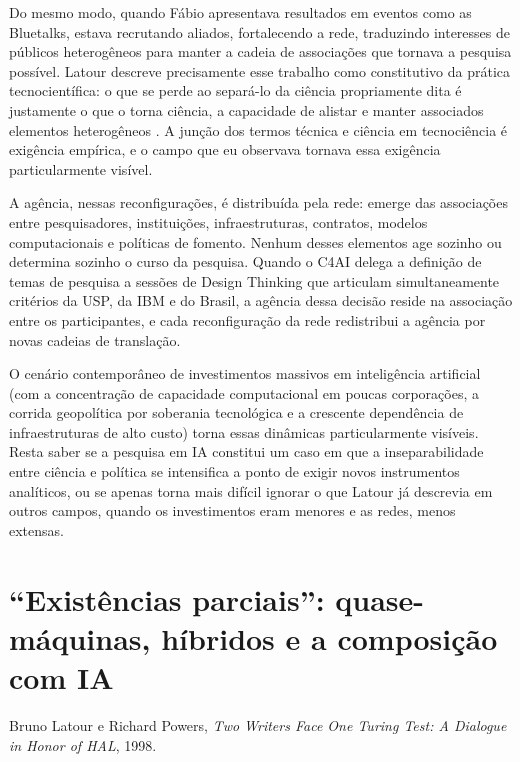 Do mesmo modo, quando Fábio apresentava resultados em eventos como as Bluetalks, estava recrutando aliados, fortalecendo a rede, traduzindo interesses de públicos heterogêneos para manter a cadeia de associações que tornava a pesquisa possível. Latour descreve precisamente esse trabalho como constitutivo da prática tecnocientífica: o que se perde ao separá-lo da ciência propriamente dita é justamente o que o torna ciência, a capacidade de alistar e manter associados elementos heterogêneos \parencite{Latour2011CienciaEmAcao}. A junção dos termos técnica e ciência em tecnociência é exigência empírica, e o campo que eu observava tornava essa exigência particularmente visível.

A agência, nessas reconfigurações, é distribuída pela rede: emerge das associações entre pesquisadores, instituições, infraestruturas, contratos, modelos computacionais e políticas de fomento. Nenhum desses elementos age sozinho ou determina sozinho o curso da pesquisa. Quando o C4AI delega a definição de temas de pesquisa a sessões de Design Thinking que articulam simultaneamente critérios da USP, da IBM e do Brasil, a agência dessa decisão reside na associação entre os participantes, e cada reconfiguração da rede redistribui a agência por novas cadeias de translação.

O cenário contemporâneo de investimentos massivos em inteligência artificial (com a concentração de capacidade computacional em poucas corporações, a corrida geopolítica por soberania tecnológica e a crescente dependência de infraestruturas de alto custo) torna essas dinâmicas particularmente visíveis. Resta saber se a pesquisa em IA constitui um caso em que a inseparabilidade entre ciência e política se intensifica a ponto de exigir novos instrumentos analíticos, ou se apenas torna mais difícil ignorar o que Latour já descrevia em outros campos, quando os investimentos eram menores e as redes, menos extensas.

\section{``Existências parciais'': quase-máquinas, híbridos e a composição com IA}
\label{subsec:existencias-parciais}

{Bruno Latour e Richard Powers, \textit{Two Writers Face One Turing Test: A Dialogue in Honor of HAL}, 1998.}

